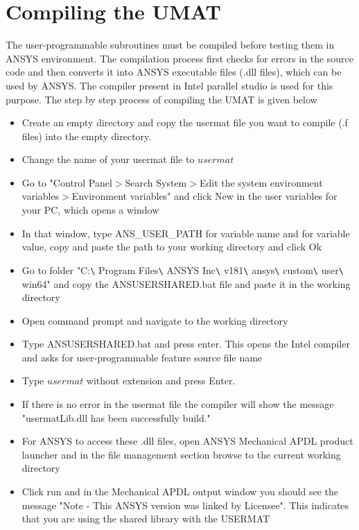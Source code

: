 \documentclass[12pt]{report}
\begin{document}
\section{Compiling the UMAT}
\indent\indent\indent The user-programmable subroutines must be compiled before testing them in ANSYS environment. The compilation process first checks for errors in the source code and then converts it into ANSYS executable files (.dll files), which can be used by ANSYS. The compiler present in Intel parallel studio is used for this purpose. The step by step process of compiling the UMAT is given below
\begin{itemize}
\item Create an empty directory and copy the usermat file you want to compile (.f files) into the empty directory.
\item Change the name of your usermat file to $usermat$
\item Go to "Control Panel$>$Search System$>$Edit the system environment variables$>$Environment variables" and click New in the user variables for your PC, which opens a window
\item In that window, type ANS\_USER\_PATH for variable name and for variable value, copy and paste the path to your working directory and click Ok
\item Go to folder "C:\texttt{\textbackslash} Program Files\texttt{\textbackslash} ANSYS Inc\texttt{\textbackslash} v181\texttt{\textbackslash} ansys\texttt{\textbackslash} custom\texttt{\textbackslash} user\texttt{\textbackslash} win64" and copy the ANSUSERSHARED.bat file and paste it in the working directory
\item Open command prompt and navigate to the working directory
\item Type ANSUSERSHARED.bat and press enter. This opens the Intel compiler and asks for user-programmable feature source file name
\item Type $usermat$ without extension and press Enter.
\item If there is no error in the usermat file the compiler will show the message "usermatLib.dll has been successfully build."  
\item For ANSYS to access these .dll files, open ANSYS Mechanical APDL product launcher and in the file management section browse to the current working directory
\item Click run and in the Mechanical APDL output window you should see the message "Note - This ANSYS version was linked by Licensee". This indicates that you are using the shared library with the USERMAT\\
\end{itemize} 
\end{document}
